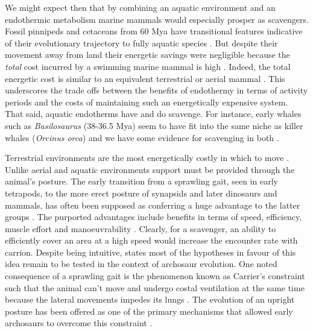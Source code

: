 \documentclass[a4paper,12pt]{article}
\begin{document}
We might expect then that by combining an aquatic environment and an endothermic metabolism marine mammals would especially prosper as scavengers. %
Fossil pinnipeds and cetaceans from 60 Mya have transitional features indicative of their evolutionary trajectory to fully aquatic species \citep{williams1999evolution}.  
But despite their movement away from land their energetic savings were negligible because the \textit{total} cost incurred by a swimming marine mammal is high \citep{williams1999evolution}. 
Indeed, the total energetic cost is similar to an equivalent terrestrial or aerial mammal \citep{williams1999evolution}.
This underscores the trade offs between the benefits of endothermy in terms of activity periods and the costs of maintaining such an energetically expensive system. 
That said, aquatic endotherms have and do scavenge. 
For instance, early whales such as \textit{Basilosaurus} (38-36.5 Mya) seem to have fit into the same niche as killer whales (\textit{Orcinus orca}) and we have some evidence for scavenging in both \citep{fahlke2012bite,Whitehead415}.



Terrestrial environments are the most energetically costly in which to move \citep{tucker1975energetic}. 
Unlike aerial and aquatic environments support must be provided through the animal's posture. %
The early transition from a sprawling gait, seen in early tetrapods, to the more erect posture of synapsids and later dinosaurs and mammals, has often been supposed as conferring a huge advantage to the latter groups \citep{sullivan2015posture}.
The purported advantages include benefits in terms of speed, efficiency, muscle effort and manoeuvrability \citep{sullivan2015posture}.
Clearly, for a scavenger, an ability to efficiently cover an area at a high speed would increase the encounter rate with carrion. 
Despite being intuitive, \cite{sullivan2015posture} states most of the hypotheses in favour of this idea remain to be tested in the context of archosaur evolution. 
One noted consequence of a sprawling gait is the phenomenon known as Carrier's constraint such that the animal can't move and undergo costal ventilation at the same time because the lateral movements impedes its lungs \citep{carrier1987evolution}. 
The evolution of an upright posture has been offered as one of the primary mechanisms that allowed early archosaurs to overcome this constraint \citep{uriona2008recruitment}. 
\end{document}
